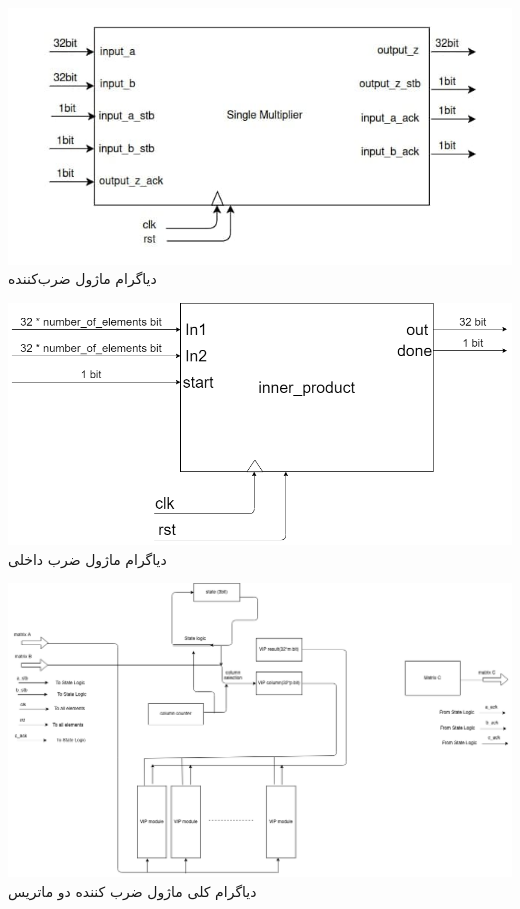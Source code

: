 \documentclass[12pt,titlepage,a4page , tikz , multi,table , svgnames,xcdraw]{article}
\begin{document}
\begin{center}
\includegraphics[scale=0.8] {Images/System Architecture/multiplier.jpg}\\
\caption{دیاگرام ماژول ضرب‌کننده}
\end{center} 

\begin{center}
\includegraphics[scale=0.4] {Images/System Architecture/DSD_Project_inner_product_overview_diagram.png}\\
\caption{دیاگرام ماژول ضرب داخلی}
\end{center} 


\begin{center}
\includegraphics[scale=0.33] {Images/System Architecture/matrix multiplier.png}\\
\caption{دیاگرام کلی ماژول ضرب کننده دو ماتریس}
\end{center} 
\end{document}
